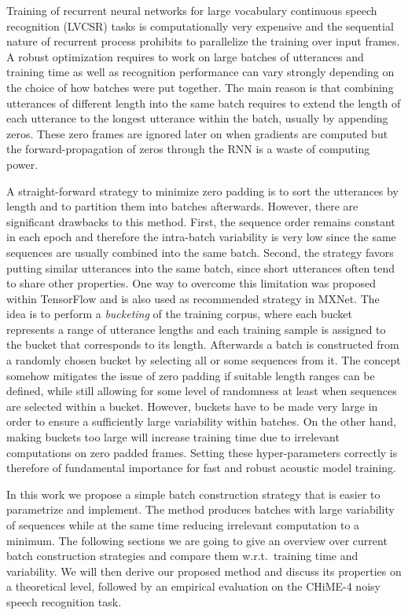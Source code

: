 \documentclass{article}
\begin{document}
    Training of recurrent neural networks for large vocabulary continuous speech recognition (LVCSR)
    tasks is computationally very expensive and the sequential nature of recurrent process prohibits to
    parallelize the training over input frames. A robust optimization requires to work on large batches of utterances
    and training time as well as recognition performance can vary strongly depending on the choice of how
    batches were put together. The main reason is that combining utterances of different length into the same batch requires 
    to extend the length of each utterance to the longest utterance within the batch, usually by appending zeros. These zero frames 
    are ignored later on when gradients are computed but the forward-propagation of zeros through the RNN is a waste of computing power.
    
    A straight-forward strategy to minimize zero padding is to sort the utterances by length and to partition them into
    batches afterwards. However, there are significant drawbacks to this method. First, the sequence order remains constant in each epoch 
    and therefore the intra-batch variability is very low since the same sequences are usually combined into the same batch. Second, the strategy favors putting similar utterances into the same batch, since short utterances often tend to share other properties.
    One way to overcome this limitation was proposed within TensorFlow and is also used as recommended 
    strategy in MXNet. The idea is to perform a \textit{bucketing} of the training corpus, where each bucket represents
    a range of utterance lengths and each training sample is assigned to the bucket that corresponds to its length.
    Afterwards a batch is constructed from a randomly chosen bucket by selecting all or some sequences from it.
    The concept somehow mitigates the issue of zero padding if suitable length ranges can be defined, while still allowing for 
    some level of randomness at least when sequences are selected within a bucket. However, buckets have to be made very large 
    in order to ensure a sufficiently large variability within batches. On the other hand, making buckets too large will 
    increase training time due to irrelevant computations on zero padded frames. Setting these hyper-parameters correctly is
    therefore of fundamental importance for fast and robust acoustic model training.
    
    In this work we propose a simple batch construction strategy that is easier to parametrize and
    implement. The method 
    produces batches with large variability of sequences while at the same time reducing irrelevant computation to a minimum.
    The following sections we are going to give an overview over current batch construction strategies and compare them 
    w.r.t.~training time and variability. We will then derive our proposed method and discuss its properties on a theoretical
    level, followed by an empirical evaluation on the CHiME-4 noisy speech recognition task. 
   
\end{document}
